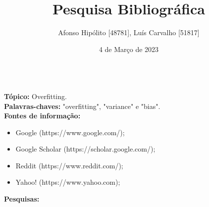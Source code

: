 \documentclass{article}
\title{Pesquisa Bibliográfica}
\author{Afonso Hipólito [48781], Luís Carvalho [51817]}
\date{4 de Março de 2023}
\begin{document}
\maketitle
    \textbf{}\\
    \textbf{Tópico:} Overfitting. \\
    \textbf{Palavras-chaves:} "overfitting", "variance" e "bias". \\
    \textbf{Fontes de informação:}
    \begin{itemize}
        \item Google (https://www.google.com/);
        \item Google Scholar (https://scholar.google.com/);
        \item Reddit (https://www.reddit.com/);
        \item Yahoo! (https://www.yahoo.com);
    \end{itemize}
    \textbf{Pesquisas:}
\end{document}
